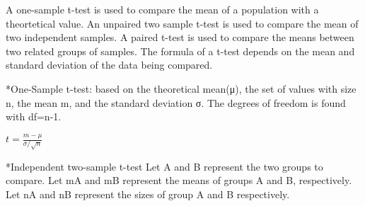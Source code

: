 \documentclass[]{article}
\begin{document}
A one-sample t-test is used to compare the mean of a population with a
theortetical value. An unpaired two sample t-test is used to compare the
mean of two independent samples. A paired t-test is used to compare the
means between two related groups of samples. The formula of a t-test
depends on the mean and standard deviation of the data being compared.

*One-Sample t-test: based on the theoretical mean(μ), the set of values
with size n, the mean m, and the standard deviation σ. The degrees of
freedom is found with df=n-1.

\(t = \frac{m-μ}{σ/\sqrt{n}}\)

*Independent two-sample t-test Let A and B represent the two groups to
compare. Let mA and mB represent the means of groups A and B,
respectively. Let nA and nB represent the sizes of group A and B
respectively.
\end{document}
